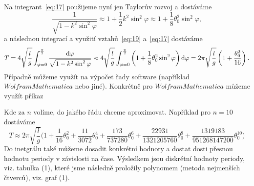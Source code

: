 \documentclass[reqno, a4paper]{amsart}
\begin{document}
		Na integrant~\eqref{eq:17} použijeme nyní jen Taylorův rozvoj a dostáváme
		\begin{equation}
			\label{eq:19}
			\frac{1}
			{
				\sqrt{1 - k^2 \sin^2 \varphi}
			}
			\approx
			1
			+
			\frac{1}{2}
			k^2
			\sin^2 \varphi
			\approx
			1
			+
			\frac{1}{8}
			\theta_{0}^2
			\sin^2 \varphi
			,
		\end{equation}
		a následnou integrací a využití vztahů~\eqref{eq:19} a~\eqref{eq:17} dostáváme
		\begin{equation}
			\label{eq:20}
			T
			=
			4
			\sqrt{
				\frac{l}{g}
			}
			\int_{\varphi=0}^{\frac{\pi}{2}}
			\frac{\mathrm{d} \varphi}
			{
				\sqrt{1 - k^2 \sin^2 \varphi}
			}
			\approx
			4
			\sqrt{
				\frac{l}{g}
			}
			\int_{\varphi=0}^{\frac{\pi}{2}}
			\left(
			1
			+
			\frac{1}{8}
			\theta_{0}^2
			\sin^2 \varphi
			\right)
			\mathrm{d} \varphi
			=
			2\pi
			\sqrt{\frac{l}{g}}
			\left(
			1
			+
			\frac{\theta_{0}^2}{16}
			\right)
			.
		\end{equation}
		Případně můžeme využít na výpočet řady software (například $ Wolfram Mathematica $ nebo jiné). Konkrétně pro $ Wolfram Mathematica $ můžeme využít příkaz
		
		\begin{verbatim*}
			
			k=Sin[\[Theta]/2]
			Series[1/(Sqrt[1-k^2*(Sin[x])^2]),{\[Theta],0,4}]
			Integrate[4*Sqrt[l/g]*Series[1/(Sqrt[1-k^2*(Sin[x])^2]),{\[Theta],0,n}],{x,0,Pi/2}]
			
		\end{verbatim*}
		Kde za $ n $ volíme, do jakého řádu chceme aproximovat. Například pro $ n=10 $ dostáváme
		\begin{equation}
			\label{eq:21}
			T
			\approx
			2 \pi \sqrt{\frac{l}{g}} \bigg(  1 +\frac{1}{16}\theta_{0} ^2+\frac{11}{3072}\theta_{0} ^4+\frac{173}{737280} \theta_{0} ^6 +\frac{22931}{1321205760} \theta_{0} ^8 
			+\frac{1319183}{951268147200} \theta_{0} ^{10} \bigg)
		\end{equation}
		Do inetgrálu také můžeme dosadit konkrétní hodnoty a dostat dosti přesnou hodnotu periody v závislosti na čase. Výsledkem jsou diskrétní hodnoty periody, viz. tabulka (1), které jsme následně proložily polynomem (metoda nejmenších čtverců), viz. graf (1).\\
		
\end{document}
